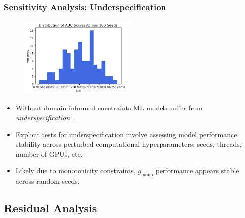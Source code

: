 \documentclass[11pt,
               aspectratio=169,
               hyperref={colorlinks}
               ]{beamer}
\begin{document}
			\begin{frame}[t]
				
				\frametitle{\textbf{Sensitivity Analysis}: Underspecification}
				\vspace{-15pt}
				\begin{figure}
					\begin{center}
						\includegraphics[height=110pt]{img/under_spec.png}
					\end{center}
				\end{figure}	
				\vspace{-10pt}
				\begin{itemize}\scriptsize
					\item Without domain-informed constraints ML models suffer from  \textit{underspecification} \cite{underspec}.
					\item Explicit tests for underspecification involve assessing model performance stability across perturbed computational hyperparameters: seeds, threads, number of GPUs, etc.
					\item Likely due to monotonicity constraints, $g_{\text{mono}}$ performance appears stable across random seeds. 
				\end{itemize}
				\normalsize
				
			\end{frame}
			
		\subsection{Residual Analysis}
\end{document}
